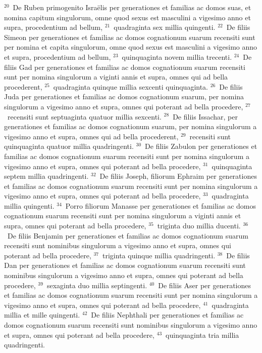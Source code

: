 ${}^{20}$~De Ruben primogenito Isra\"elis per generationes et familias ac domos suas, et nomina capitum singulorum, omne quod sexus est masculini a vigesimo anno et supra, procedentium ad bellum,
${}^{21}$~quadraginta sex millia quingenti.
${}^{22}$~De filiis Simeon per generationes et familias ac domos cognationum suarum recensiti sunt per nomina et capita singulorum, omne quod sexus est masculini a vigesimo anno et supra, procedentium ad bellum,
${}^{23}$~quinquaginta novem millia trecenti.
${}^{24}$~De filiis Gad per generationes et familias ac domos cognationum suarum recensiti sunt per nomina singulorum a viginti annis et supra, omnes qui ad bella procederent,
${}^{25}$~quadraginta quinque millia sexcenti quinquaginta.
${}^{26}$~De filiis Juda per generationes et familias ac domos cognationum suarum, per nomina singulorum a vigesimo anno et supra, omnes qui poterant ad bella procedere,
${}^{27}$~recensiti sunt septuaginta quatuor millia sexcenti.
${}^{28}$~De filiis Issachar, per generationes et familias ac domos cognationum suarum, per nomina singulorum a vigesimo anno et supra, omnes qui ad bella procederent,
${}^{29}$~recensiti sunt quinquaginta quatuor millia quadringenti.
${}^{30}$~De filiis Zabulon per generationes et familias ac domos cognationum suarum recensiti sunt per nomina singulorum a vigesimo anno et supra, omnes qui poterant ad bella procedere,
${}^{31}$~quinquaginta septem millia quadringenti.
${}^{32}$~De filiis Joseph, filiorum Ephraim per generationes et familias ac domos cognationum suarum recensiti sunt per nomina singulorum a vigesimo anno et supra, omnes qui poterant ad bella procedere,
${}^{33}$~quadraginta millia quingenti.
${}^{34}$~Porro filiorum Manasse per generationes et familias ac domos cognationum suarum recensiti sunt per nomina singulorum a viginti annis et supra, omnes qui poterant ad bella procedere,
${}^{35}$~triginta duo millia ducenti.
${}^{36}$~De filiis Benjamin per generationes et familias ac domos cognationum suarum recensiti sunt nominibus singulorum a vigesimo anno et supra, omnes qui poterant ad bella procedere,
${}^{37}$~triginta quinque millia quadringenti.
${}^{38}$~De filiis Dan per generationes et familias ac domos cognationum suarum recensiti sunt nominibus singulorum a vigesimo anno et supra, omnes qui poterant ad bella procedere,
${}^{39}$~sexaginta duo millia septingenti.
${}^{40}$~De filiis Aser per generationes et familias ac domos cognationum suarum recensiti sunt per nomina singulorum a vigesimo anno et supra, omnes qui poterant ad bella procedere,
${}^{41}$~quadraginta millia et mille quingenti.
${}^{42}$~De filiis Nephthali per generationes et familias ac domos cognationum suarum recensiti sunt nominibus singulorum a vigesimo anno et supra, omnes qui poterant ad bella procedere,
${}^{43}$~quinquaginta tria millia quadringenti.


